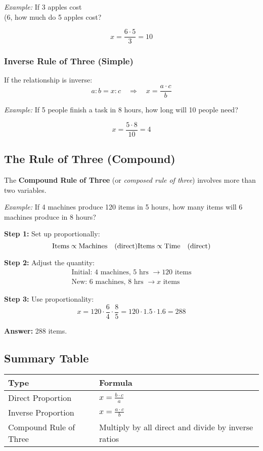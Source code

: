 \textit{Example:} If 3 apples cost \\(6, how much do 5 apples cost?

\[
x = \frac{6 \cdot 5}{3} = 10
\]

\subsubsection*{Inverse Rule of Three (Simple)}

If the relationship is inverse:
\[
a : b = x : c \quad \Rightarrow \quad x = \frac{a \cdot c}{b}
\]

\textit{Example:} If 5 people finish a task in 8 hours, how long will 10 people need?

\[
x = \frac{5 \cdot 8}{10} = 4
\]

\subsection{The Rule of Three (Compound)}

The \textbf{Compound Rule of Three} (or \textit{composed rule of three}) involves more than two variables.

\textit{Example:} If 4 machines produce 120 items in 5 hours, how many items will 6 machines produce in 8 hours?

\textbf{Step 1:} Set up proportionally:
\[
\text{Items} \propto \text{Machines} \quad (\text{direct}) \\
\text{Items} \propto \text{Time} \quad (\text{direct})
\]

\textbf{Step 2:} Adjust the quantity:
\begin{align*}
\text{Initial: } 4 \text{ machines, } 5 \text{ hrs } \rightarrow 120 \text{ items} \\
\text{New: } 6 \text{ machines, } 8 \text{ hrs } \rightarrow x \text{ items}
\end{align*}

\textbf{Step 3:} Use proportionality:
\[
x = 120 \cdot \frac{6}{4} \cdot \frac{8}{5} = 120 \cdot 1.5 \cdot 1.6 = 288
\]

\textbf{Answer:} 288 items.

\subsection*{Summary Table}

\begin{center}
\begin{tabular}{|l|l|}
\hline
\textbf{Type} & \textbf{Formula} \\
\hline
Direct Proportion & \(x = \frac{b \cdot c}{a}\) \\
Inverse Proportion & \(x = \frac{a \cdot c}{b}\) \\
Compound Rule of Three & Multiply by all direct and divide by inverse ratios \\
\hline
\end{tabular}
\end{center}

\newpage
